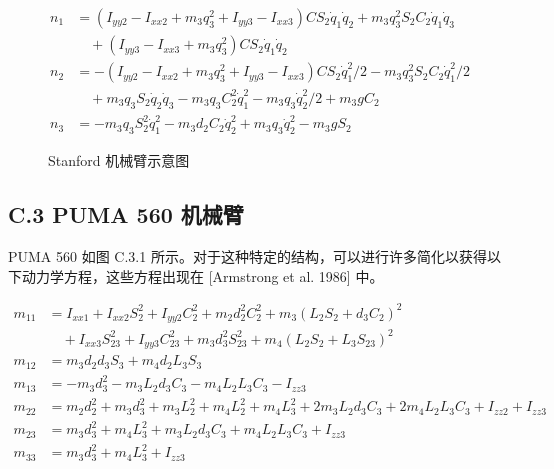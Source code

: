 \documentclass[UTF8]{ctexart}
\begin{document}
\begin{align}
n_1 &= (I_{yy2} - I_{xx2} + m_3q_3^2 + I_{yy3} - I_{xx3})CS_2\dot{q}_1\dot{q}_2 + m_3q_3^2S_2C_2\dot{q}_1\dot{q}_3 \\
&\quad + (I_{yy3} - I_{xx3} + m_3q_3^2)CS_2\dot{q}_1\dot{q}_2 \\
n_2 &= -(I_{yy2} - I_{xx2} + m_3q_3^2 + I_{yy3} - I_{xx3})CS_2\dot{q}_1^2/2 - m_3q_3^2S_2C_2\dot{q}_1^2/2 \\
&\quad + m_3q_3S_2\dot{q}_2\dot{q}_3 - m_3q_3C_2^2\dot{q}_1^2 - m_3q_3\dot{q}_2^2/2 + m_3gC_2 \\
n_3 &= -m_3q_3S_2^2\dot{q}_1^2 - m_3d_2C_2\dot{q}_2^2 + m_3q_3\dot{q}_2^2 - m_3gS_2
\end{align}

\begin{figure}[H]
\centering
{}
\caption{Stanford 机械臂示意图}
\end{figure}

\subsection*{C.3 PUMA 560 机械臂}

PUMA 560 如图 C.3.1 所示。对于这种特定的结构，可以进行许多简化以获得以下动力学方程，这些方程出现在 [Armstrong et al. 1986] 中。

\begin{align}
m_{11} &= I_{xx1} + I_{xx2}S_2^2 + I_{yy2}C_2^2 + m_2d_2^2C_2^2 + m_3(L_2S_2 + d_3C_2)^2 \\
&\quad + I_{xx3}S_{23}^2 + I_{yy3}C_{23}^2 + m_3d_3^2S_{23}^2 + m_4(L_2S_2 + L_3S_{23})^2 \\
m_{12} &= m_3d_2d_3S_3 + m_4d_2L_3S_3 \\
m_{13} &= -m_3d_3^2 - m_3L_2d_3C_3 - m_4L_2L_3C_3 - I_{zz3} \\
m_{22} &= m_2d_2^2 + m_3d_3^2 + m_3L_2^2 + m_4L_2^2 + m_4L_3^2 + 2m_3L_2d_3C_3 + 2m_4L_2L_3C_3 + I_{zz2} + I_{zz3} \\
m_{23} &= m_3d_3^2 + m_4L_3^2 + m_3L_2d_3C_3 + m_4L_2L_3C_3 + I_{zz3} \\
m_{33} &= m_3d_3^2 + m_4L_3^2 + I_{zz3}
\end{align}
\end{document}
